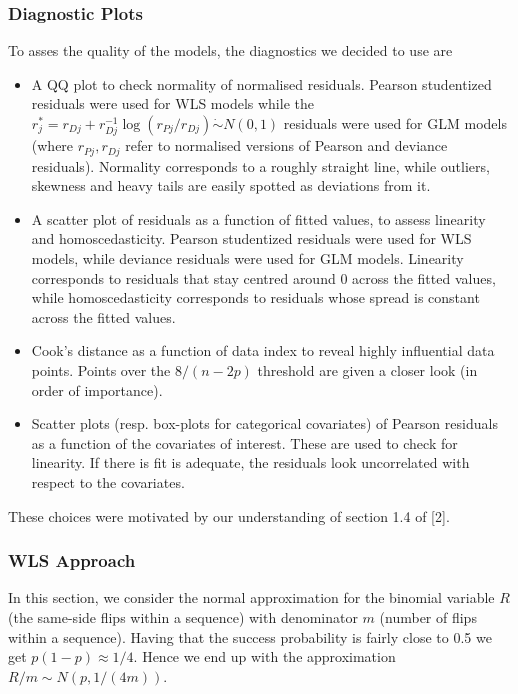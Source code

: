 \documentclass[a4paper, 12pt,oneside]{article}
\begin{document}
			\subsubsection{Diagnostic Plots}
				To asses the quality of the models, the diagnostics we decided to use are 
				\begin{itemize}
					\item A QQ plot to check normality of normalised residuals. Pearson studentized residuals were used for WLS models while the $r_j^*=r_{D j}+r_{D j}^{-1} \log \left(r_{P j} / r_{D j}\right) \dot{\sim} N(0,1)$ residuals were used for GLM models (where $r_{P j},r_{D j}$ refer to normalised versions of Pearson and deviance residuals). Normality corresponds to a roughly straight line, while outliers, skewness and heavy tails are easily spotted as deviations from it.
					\item A scatter plot of residuals as a function of fitted values, to assess linearity and homoscedasticity. Pearson studentized residuals were used for WLS models, while deviance residuals were used for GLM models. Linearity corresponds to residuals that stay centred around 0 across the fitted values, while homoscedasticity corresponds to residuals whose spread is constant across the fitted values.
					\item Cook's distance as a function of data index to reveal highly influential data points. Points over the $8/(n-2p)$ threshold are given a closer look (in order of importance). 
					\item Scatter plots (resp. box-plots for categorical covariates) of Pearson residuals as a function of the covariates of interest. These are used to check for linearity. If there is fit is adequate, the residuals look uncorrelated with respect to the covariates. 
				\end{itemize}
				These choices were motivated by our understanding of section 1.4 of [2]. 
			\subsubsection{WLS Approach}
			In this section, we consider the normal approximation for the binomial variable $R$ (the same-side flips within a sequence) with denominator $m$ (number of flips within a sequence). 
			Having that the success probability is fairly close to 0.5 we get $p(1-p)\approx1/4$. Hence we end up with the approximation $R/m \sim N(p,1/(4m))$. 
\end{document}
